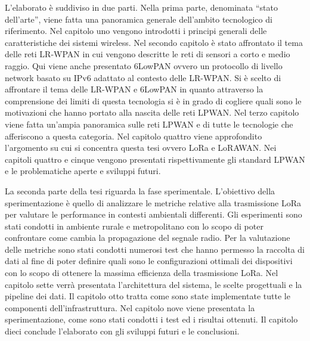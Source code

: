 \documentclass[12pt,a4paper,openright,twoside]{report}
\begin{document}
L'elaborato \`e suddiviso in due parti. Nella prima parte, denominata ``stato dell'arte'', viene fatta una panoramica generale dell'ambito tecnologico di riferimento.
Nel capitolo uno vengono introdotti i principi generali delle caratteristiche dei sistemi wireless. Nel secondo capitolo \`e stato affrontato il tema delle reti LR-WPAN in cui vengono descritte le reti di sensori a corto e medio raggio. Qui viene anche presentato 6LowPAN ovvero un protocollo di livello network basato su IPv6 adattato al contesto delle LR-WPAN.
Si \`e scelto di affrontare il tema delle LR-WPAN e 6LowPAN in quanto attraverso la comprensione dei limiti di questa tecnologia si \`e in grado di cogliere quali sono le motivazioni che hanno portato alla nascita delle reti LPWAN.
Nel terzo capitolo viene fatta un'ampia panoramica sulle reti LPWAN e di tutte le tecnologie che afferiscono a questa categoria. 
Nel capitolo quattro viene approfondito l'argomento su cui si concentra questa tesi ovvero LoRa e LoRAWAN.
Nei capitoli quattro e cinque vengono presentati rispettivamente gli standard LPWAN e le problematiche aperte e sviluppi futuri.  

La seconda parte della tesi riguarda la fase sperimentale. 
L'obiettivo della sperimentazione \`e quello di analizzare le metriche relative alla trasmissione LoRa per valutare le performance in contesti ambientali differenti. 
Gli esperimenti sono stati condotti in ambiente rurale e metropolitano con lo scopo di poter confrontare come cambia la propagazione del segnale radio. 
Per la valutazione delle metriche sono stati condotti numerosi test che hanno permesso la raccolta di dati al fine di poter definire quali sono le configurazioni ottimali dei dispositivi con lo scopo di ottenere la massima efficienza della trasmissione LoRa. 
Nel capitolo sette verr\`a presentata l'architettura del sistema, le scelte progettuali e la pipeline dei dati. Il capitolo otto tratta come sono state implementate tutte le componenti dell'infrastruttura. Nel capitolo nove viene presentata la sperimentazione, come sono stati condotti i test ed i risultai ottenuti. Il capitolo dieci conclude l'elaborato con gli sviluppi futuri e le conclusioni.





\clearpage{\pagestyle{empty}\cleardoublepage}
\tableofcontents                        %
\rhead[\fancyplain{}{\bfseries\leftmark}]{\fancyplain{}{\bfseries\thepage}}
\clearpage{\pagestyle{empty}\cleardoublepage}
\listoffigures                          %
\clearpage{\pagestyle{empty}\cleardoublepage}
\listoftables                           %
\clearpage{\pagestyle{empty}\cleardoublepage}
\end{document}
